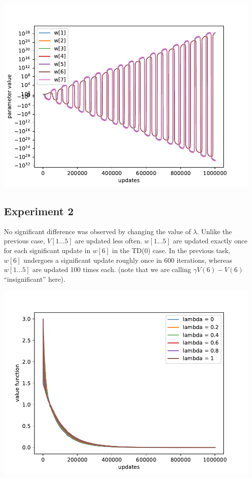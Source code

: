 \documentclass[11pt]{article}
\begin{document}
\begin{center}
\includegraphics[width=15cm]{expt1_2.pdf}
\end{center}

\subsection{Experiment 2}
No significant difference was observed by changing the value of $\lambda$. Unlike the previous case, $V[1...5]$ are updated less often. $w[1...5]$ are updated exactly once for each significant update in $w[6]$ in the TD(0) case. In the previous task, $w[6]$ undergoes a significant update roughly once in 600 iterations, whereas $w[1...5]$ are updated 100 times each. (note that we are calling $\gamma V(6) - V(6)$ ``insignificant'' here).
\begin{center}
\includegraphics[width=15cm]{expt2.pdf}
\end{center}
\end{document}
